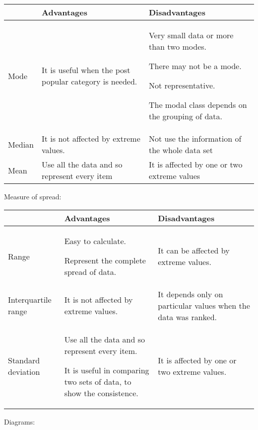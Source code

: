 \begin{table}[!htpb]
	\begin{tabular}{|l|p{6.5cm}|p{6.5cm}|}
		\hline
		& \textbf{Advantages} & \textbf{Disadvantages} \\ \hline
		Mode   &  It is useful when the post popular category is needed.          &  Very small data or more than two modes.
		
			 There may not be a mode.
			 
		 Not representative.
		 
			 The modal class depends on the grouping of data.
	           \\ \hline
		Median &     It is not affected by extreme values.       &   Not use the information of the whole data set            \\ \hline
		Mean   &      Use all the data and so represent every item      &    It is affected by one or two extreme values           \\ \hline
	\end{tabular}
\end{table}

\vspace{2cm}

Measure of spread:

\begin{table}[!htpb]
	\begin{tabular}{|l|p{5.5cm}|p{6cm}|}
		\hline
		& \textbf{Advantages} & \textbf{Disadvantages} \\ \hline
		Range   &  Easy to calculate. 
		
		Represent the complete spread of data.
		         &  It can be affected by extreme values.
		\\ \hline
		Interquartile range &     It is not affected by extreme values.       &   It depends only on particular values when the data was ranked.            \\ \hline
		Standard deviation   &      Use all the data and so represent every item.  
		
		It is useful in comparing two sets of data, to show the consistence.
		    &    It is affected by one or two extreme values.           \\ \hline
	\end{tabular}
\end{table}

\newpage 
Diagrams:

